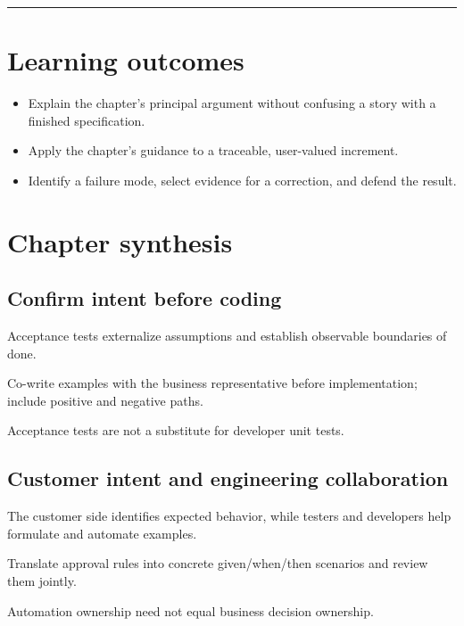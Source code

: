 \documentclass[11pt,letterpaper]{article}
\begin{document}
\tableofcontents\medskip\noindent\rule{\linewidth}{0.4pt}\medskip
\section{Learning outcomes}
\begin{itemize}[leftmargin=*,itemsep=2pt]
\item Explain the chapter's principal argument without confusing a story with a finished specification.
\item Apply the chapter's guidance to a traceable, user-valued increment.
\item Identify a failure mode, select evidence for a correction, and defend the result.
\end{itemize}
\section{Chapter synthesis}
\subsection{Confirm intent before coding}
Acceptance tests externalize assumptions and establish observable boundaries of done.

\begin{tcolorbox}[colback=tealback,colframe=navy,title={Engineering translation},breakable]
Co-write examples with the business representative before implementation; include positive and negative paths.

\end{tcolorbox}
\begin{tcolorbox}[colback=amberback,colframe=navy,title={Failure mode to watch},breakable]
Acceptance tests are not a substitute for developer unit tests.

\end{tcolorbox}
\subsection{Customer intent and engineering collaboration}
The customer side identifies expected behavior, while testers and developers help formulate and automate examples.

\begin{tcolorbox}[colback=tealback,colframe=navy,title={Engineering translation},breakable]
Translate approval rules into concrete given/when/then scenarios and review them jointly.

\end{tcolorbox}
\begin{tcolorbox}[colback=amberback,colframe=navy,title={Failure mode to watch},breakable]
Automation ownership need not equal business decision ownership.

\end{tcolorbox}
\end{document}
